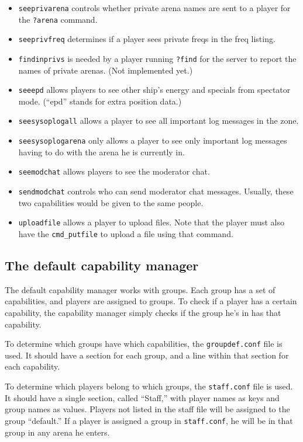 \documentclass{article}
\begin{document}
\begin{itemize}
\item{\texttt{seeprivarena}} controls whether private arena names are
sent to a player for the \verb/?arena/ command.
\item{\texttt{seeprivfreq}} determines if a player sees private freqs in
the freq listing.
\item{\texttt{findinprivs}} is needed by a player running \verb/?find/
for the server to report the names of private arenas. (Not implemented
yet.)
\item{\texttt{seeepd}} allows players to see other ship's energy and
specials from spectator mode. (``epd'' stands for extra position data.)
\item{\texttt{seesysoplogall}} allows a player to see all important log
messages in the zone.
\item{\texttt{seesysoplogarena}} only allows a player to see only
important log messages having to do with the arena he is currently in.
\item{\texttt{seemodchat}} allows players to see the moderator chat.
\item{\texttt{sendmodchat}} controls who can send moderator chat
messages. Usually, these two capabilities would be given to the same
people.
\item{\texttt{uploadfile}} allows a player to upload files. Note that
the player must also have the \texttt{cmd\_putfile} to upload a file
using that command.
\end{itemize}


\subsection{The default capability manager}

The default capability manager works with groups. Each group has a set
of capabilities, and players are assigned to groups. To check if a
player has a certain capability, the capability manager simply checks if
the group he's in has that capability.

To determine which groups have which capabilities, the
\verb/groupdef.conf/ file is used. It should have a section for each
group, and a line within that section for each capability.

To determine which players belong to which groups, the \verb/staff.conf/
file is used. It should have a single section, called ``Staff,'' with
player names as keys and group names as values. Players not listed in
the staff file will be assigned to the group ``default.'' If a player is
assigned a group in \verb/staff.conf/, he will be in that group in any
arena he enters.
\end{document}
